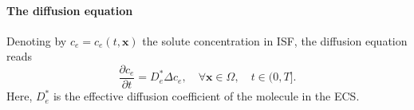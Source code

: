 \documentclass[10pt]{article}
\newcommand{\ie}{\emph{i.e.}\;}
\newcommand{\1}{^{(1)}}
\newcommand{\2}{^{(2)}}
\newcommand {\f}   {\frac}
\newcommand {\p}   {\partial}
\newcommand {\x}   {\mathbf{x}}
\newcommand {\vel}   {\mathbf{v}}
\newcommand{\commentout}[1]{}
\begin{document}
\paragraph{The diffusion equation}
Denoting by $c_e = c_e(t,\x)$ the solute concentration in ISF, the diffusion equation reads
\begin{equation}
    \f{\p c_e}{\p t} = D_e^* \Delta c_e , \quad \forall \x\in \Omega,\quad t\in (0,T].
    \label{eq:diffusion-convection}
\end{equation}
Here, $D_e^*$ is the effective diffusion coefficient of the molecule in the ECS.
\commentout{
\paragraph{The pressure equation.}
To represent the movement of the interstitial fluid, we use a compressibility relation that links the density of the fluid $\rho = \rho(t,\x)$ to its pressure $p_e = p_e(t,\x)$ (see Appendix~\ref{app:derivation} for the details of this computation). The time-space evolution of the pressure is given by
\begin{equation}
    C_e \frac{\partial p_e}{\partial t} +  \nabla\cdot( v_e ) +  C_e v_e  \cdot \nabla p_e = 0,\quad \forall x\in \Omega,\quad t\in (0,T],
    \label{eq:pressure-1comp}
\end{equation}
in which $C_e$ is the compressibility coefficient.  
}
\end{document}
